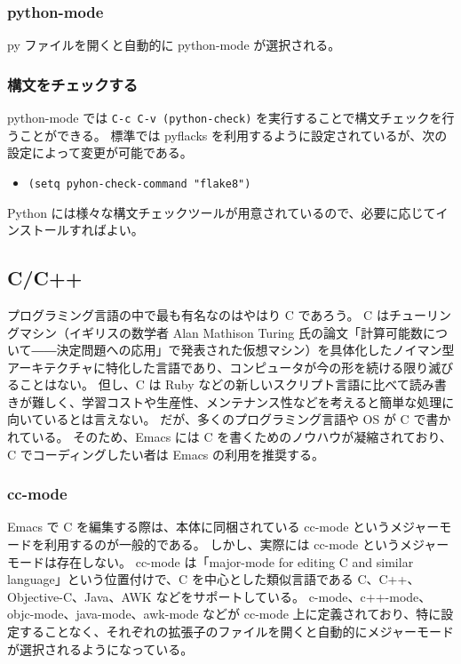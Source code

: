 \subsubsection{python-mode}
py ファイルを開くと自動的に python-mode が選択される。
\subsubsection{構文をチェックする}
python-mode では \texttt{C-c C-v (python-check)} を実行することで構文チェックを行うことができる。
標準では pyflacks を利用するように設定されているが、次の設定によって変更が可能である。
\begin{itemize}\setlength{\leftskip}{-1.00zw}%
\item[] \verb|(setq pyhon-check-command "flake8")|
\end{itemize}
Python には様々な構文チェックツールが用意されているので、必要に応じてインストールすればよい。
\subsection{C/C++}
プログラミング言語の中で最も有名なのはやはり C であろう。
C はチューリングマシン（イギリスの数学者 Alan Mathison Turing 氏の論文「計算可能数について―\hspc{-1.0pt}―決定問題への応用」で発表された仮想マシン）を具体化したノイマン型アーキテクチャに特化した言語であり、コンピュータが今の形を続ける限り滅びることはない。
但し、C は Ruby などの新しいスクリプト言語に比べて読み書きが難しく、学習コストや生産性、メンテナンス性などを考えると簡単な処理に向いているとは言えない。
だが、多くのプログラミング言語や OS が C で書かれている。
そのため、Emacs には C を書くためのノウハウが凝縮されており、C でコーディングしたい者は Emacs の利用を推奨する。
\subsubsection{cc-mode}
Emacs で C を編集する際は、本体に同梱されている cc-mode というメジャーモードを利用するのが一般的である。
しかし、実際には cc-mode というメジャーモードは存在しない。
cc-mode は「major-mode for editing C and similar language」という位置付けで、C を中心とした類似言語である C、C++、Objective-C、Java、AWK などをサポートしている。
c-mode、c++-mode、objc-mode、java-mode、awk-mode などが cc-mode 上に定義されており、特に設定することなく、それぞれの拡張子のファイルを開くと自動的にメジャーモードが選択されるようになっている。\\

